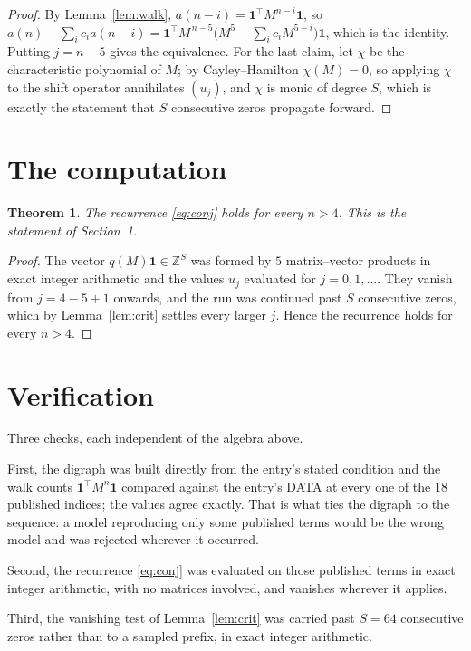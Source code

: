 \documentclass[11pt,a4paper]{article}
\theoremstyle{plain}
\newtheorem{theorem}{Theorem}
\theoremstyle{definition}
\begin{document}
\begin{proof}
By Lemma~\ref{lem:walk}, $a(n-i)=\mathbf{1}^{\!\top}M^{n-i}\mathbf{1}$, so
$a(n)-\sum_i c_i a(n-i)
=\mathbf{1}^{\!\top}M^{\,n-5}\bigl(M^{5}-\sum_i c_i M^{5-i}\bigr)
\mathbf{1}$, which is the identity. Putting $j=n-5$ gives the equivalence. For the
last claim, let $\chi$ be the characteristic polynomial of $M$; by Cayley--Hamilton
$\chi(M)=0$, so applying $\chi$ to the shift operator annihilates $(u_j)$, and $\chi$ is
monic of degree $S$, which is exactly the statement that $S$ consecutive zeros propagate
forward.
\end{proof}

\section{The computation}

\begin{theorem}
The recurrence \eqref{eq:conj} holds for every $n>4$. This is the statement of
Section~1.
\end{theorem}

\begin{proof}
The vector $q(M)\mathbf{1}\in\mathbb{Z}^{S}$ was formed by $5$ matrix--vector
products in exact integer arithmetic and the values $u_j$ evaluated for
$j=0,1,\dots$. They vanish from $j=4-5+1$ onwards, and the run was continued past
$S$ consecutive zeros, which by Lemma~\ref{lem:crit} settles every larger $j$. Hence the
recurrence holds for every $n>4$.
\end{proof}

\section{Verification}

Three checks, each independent of the algebra above.

First, the digraph was built directly from the entry's stated condition and the walk counts
$\mathbf{1}^{\!\top}M^{n}\mathbf{1}$ compared against the entry's DATA at every one of
the $18$ published indices; the values agree exactly. That is what ties the digraph to
the sequence: a model reproducing only some published terms would be the wrong model and
was rejected wherever it occurred.

Second, the recurrence \eqref{eq:conj} was evaluated on those published terms in exact
integer arithmetic, with no matrices involved, and vanishes wherever it applies.

Third, the vanishing test of Lemma~\ref{lem:crit} was carried past $S=64$ consecutive
zeros rather than to a sampled prefix, in exact integer arithmetic.
\end{document}
